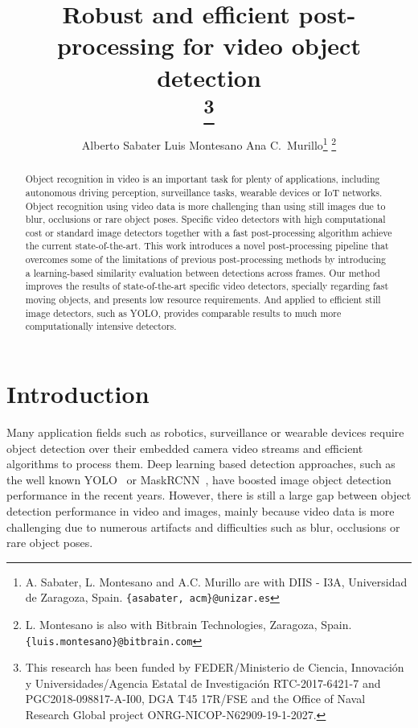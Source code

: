 \documentclass[letterpaper, 10 pt, conference]{ieeeconf}
\title{\LARGE \bf
Robust and efficient post-processing for video object detection\\
\thanks{This research has been funded by FEDER/Ministerio de Ciencia, Innovación y Universidades/Agencia Estatal de Investigación RTC-2017-6421-7 
and PGC2018-098817-A-I00, DGA T45 17R/FSE and the Office of Naval Research Global project ONRG-NICOP-N62909-19-1-2027.
}}
\author{Alberto Sabater \hspace{0.5cm} Luis Montesano \hspace{0.5cm}   Ana C.~Murillo\thanks{ A. Sabater, L. Montesano and A.C. Murillo are with 
DIIS - I3A, Universidad de Zaragoza, Spain. {\tt\small \{asabater, acm\}@unizar.es}
}
\thanks{  L. Montesano is also with Bitbrain Technologies, Zaragoza, Spain. {\tt\small \{luis.montesano\}@bitbrain.com}
}
}
\begin{document}
\maketitle
\thispagestyle{empty}
\pagestyle{empty}


\begin{abstract}


Object recognition in video is an important task for plenty of applications, including autonomous driving perception, surveillance tasks, wearable devices or IoT networks. Object recognition using video data is more challenging than using still images due to blur, occlusions or rare object poses. Specific video detectors with high computational cost or standard image detectors together with a fast post-processing algorithm achieve the current state-of-the-art. This work introduces a novel post-processing pipeline that overcomes some of the limitations of previous post-processing methods 
by introducing a learning-based similarity evaluation between detections across frames. 
Our method improves the results of state-of-the-art specific video detectors, specially regarding fast moving objects, and presents low resource requirements. And applied to efficient still image detectors, such as YOLO, provides comparable results to much more computationally intensive detectors. 







\end{abstract}


\section{Introduction}





















Many application fields such as robotics, surveillance or wearable devices require object detection over their embedded camera video streams and efficient algorithms to process them. 
Deep learning based detection approaches, such as the well known YOLO~\cite{redmon2016you} or MaskRCNN~\cite{he2017mask}, have boosted image object detection performance in the recent years. 
However, there is still a large gap between object detection performance in video and images, mainly because video data is more challenging due to numerous artifacts and difficulties such as blur, occlusions or rare object poses.
\end{document}
